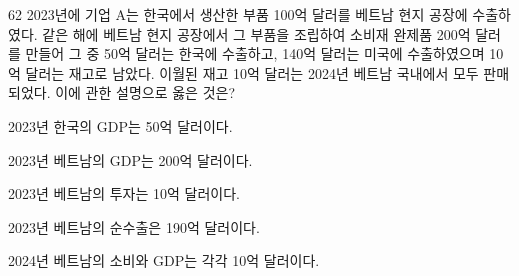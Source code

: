 \begin{question}{62}
2023년에 기업 A는 한국에서 생산한 부품 100억 달러를 베트남 현지 공장에 수출하였다. 같은 해에 베트남 현지 공장에서 그 부품을 조립하여 소비재 완제품 200억 달러를 만들어 그 중 50억 달러는 한국에 수출하고, 140억 달러는 미국에 수출하였으며 10억 달러는 재고로 남았다. 이월된 재고 10억 달러는 2024년 베트남 국내에서 모두 판매되었다. 이에 관한 설명으로 옳은 것은?
\begin{choices}
  \item 2023년 한국의 GDP는 50억 달러이다.
  \item 2023년 베트남의 GDP는 200억 달러이다.
  \item 2023년 베트남의 투자는 10억 달러이다.
  \item 2023년 베트남의 순수출은 190억 달러이다.
  \item 2024년 베트남의 소비와 GDP는 각각 10억 달러이다.
\end{choices}
\end{question}

